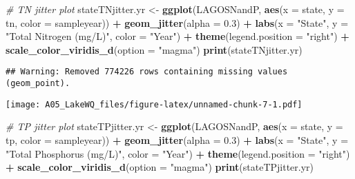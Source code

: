 \documentclass[]{article}
\newenvironment{Shaded}{\begin{snugshade}}{\end{snugshade}}
\newcommand{\CommentTok}[1]{\textcolor[rgb]{0.56,0.35,0.01}{\textit{#1}}}
\newcommand{\DataTypeTok}[1]{\textcolor[rgb]{0.13,0.29,0.53}{#1}}
\newcommand{\FloatTok}[1]{\textcolor[rgb]{0.00,0.00,0.81}{#1}}
\newcommand{\KeywordTok}[1]{\textcolor[rgb]{0.13,0.29,0.53}{\textbf{#1}}}
\newcommand{\NormalTok}[1]{#1}
\newcommand{\OperatorTok}[1]{\textcolor[rgb]{0.81,0.36,0.00}{\textbf{#1}}}
\newcommand{\StringTok}[1]{\textcolor[rgb]{0.31,0.60,0.02}{#1}}
\begin{document}
\begin{Shaded}
\begin{Highlighting}[]
\CommentTok{# TN jitter plot}
\NormalTok{stateTNjitter.yr <-}\StringTok{ }\KeywordTok{ggplot}\NormalTok{(LAGOSNandP, }\KeywordTok{aes}\NormalTok{(}\DataTypeTok{x =}\NormalTok{ state, }\DataTypeTok{y =}\NormalTok{ tn, }\DataTypeTok{color =}\NormalTok{ sampleyear)) }\OperatorTok{+}
\StringTok{  }\KeywordTok{geom_jitter}\NormalTok{(}\DataTypeTok{alpha =} \FloatTok{0.3}\NormalTok{) }\OperatorTok{+}
\StringTok{  }\KeywordTok{labs}\NormalTok{(}\DataTypeTok{x =} \StringTok{"State"}\NormalTok{, }\DataTypeTok{y =} \StringTok{"Total Nitrogen (mg/L)"}\NormalTok{, }\DataTypeTok{color =} \StringTok{"Year"}\NormalTok{) }\OperatorTok{+}
\StringTok{  }\KeywordTok{theme}\NormalTok{(}\DataTypeTok{legend.position =} \StringTok{"right"}\NormalTok{) }\OperatorTok{+}
\StringTok{  }\KeywordTok{scale_color_viridis_d}\NormalTok{(}\DataTypeTok{option =} \StringTok{"magma"}\NormalTok{)}
\KeywordTok{print}\NormalTok{(stateTNjitter.yr)}
\end{Highlighting}
\end{Shaded}

\begin{verbatim}
## Warning: Removed 774226 rows containing missing values (geom_point).
\end{verbatim}

\texttt{[image: A05\_LakeWQ\_files/figure-latex/unnamed-chunk-7-1.pdf]}

\begin{Shaded}
\begin{Highlighting}[]
\CommentTok{# TP jitter plot}
\NormalTok{stateTPjitter.yr <-}\StringTok{ }\KeywordTok{ggplot}\NormalTok{(LAGOSNandP, }\KeywordTok{aes}\NormalTok{(}\DataTypeTok{x =}\NormalTok{ state, }\DataTypeTok{y =}\NormalTok{ tp, }\DataTypeTok{color =}\NormalTok{ sampleyear)) }\OperatorTok{+}
\StringTok{  }\KeywordTok{geom_jitter}\NormalTok{(}\DataTypeTok{alpha =} \FloatTok{0.3}\NormalTok{) }\OperatorTok{+}
\StringTok{  }\KeywordTok{labs}\NormalTok{(}\DataTypeTok{x =} \StringTok{"State"}\NormalTok{, }\DataTypeTok{y =} \StringTok{"Total Phosphorus (mg/L)"}\NormalTok{, }\DataTypeTok{color =} \StringTok{"Year"}\NormalTok{) }\OperatorTok{+}
\StringTok{  }\KeywordTok{theme}\NormalTok{(}\DataTypeTok{legend.position =} \StringTok{"right"}\NormalTok{) }\OperatorTok{+}
\StringTok{  }\KeywordTok{scale_color_viridis_d}\NormalTok{(}\DataTypeTok{option =} \StringTok{"magma"}\NormalTok{)}
\KeywordTok{print}\NormalTok{(stateTPjitter.yr)}
\end{Highlighting}
\end{Shaded}
\end{document}
